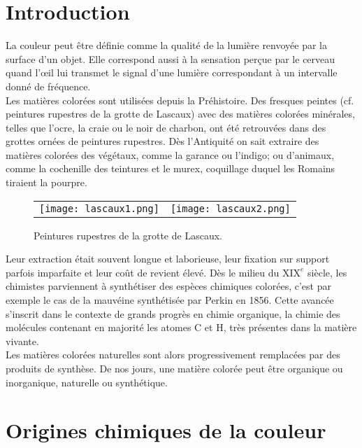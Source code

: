 \documentclass[11pt,a4paper]{report}
\begin{document}
\newpage
\section*{Introduction}

La couleur peut être définie comme la qualité de la lumière renvoyée par la surface d'un objet. Elle correspond aussi à la sensation perçue par le cerveau quand l’œil lui transmet le signal d'une lumière correspondant à un intervalle donné de fréquence.\\

Les matières colorées sont utilisées depuis la Préhistoire. Des fresques peintes (cf. peintures rupestres de la grotte de Lascaux) avec des matières colorées minérales, telles que l'ocre, la craie ou le noir de charbon, ont été retrouvées dans des grottes ornées de peintures rupestres. Dès l'Antiquité on sait extraire des matières colorées des végétaux, comme la garance ou l'indigo; ou d'animaux, comme la cochenille des teintures et le murex, coquillage duquel les Romains tiraient la pourpre.

\begin{figure}[h!]
	\begin{center}
		\begin{tabular}{cc}
  		\texttt{[image: lascaux1.png]} &
   		\texttt{[image: lascaux2.png]}\\
	\end{tabular}
	\caption{Peintures rupestres de la grotte de Lascaux.}
	\end{center}
\end{figure}

Leur extraction était souvent longue et laborieuse, leur fixation sur support parfois imparfaite et leur coût de revient élevé. Dès le milieu du $\text{XIX}^e$ siècle, les chimistes parviennent à synthétiser des espèces chimiques colorées, c'est par exemple le cas de la mauvéine synthétisée par Perkin en 1856. Cette avancée s'inscrit dans le contexte de grands progrès en chimie organique, la chimie des molécules contenant en majorité les atomes C et H, très présentes dans la matière vivante.\\

Les matières colorées naturelles sont alors progressivement remplacées par des produits de synthèse. De nos jours, une matière colorée peut être organique ou inorganique, naturelle ou synthétique. 

\newpage
\section{Origines chimiques de la couleur}\label{sec:1}
\end{document}
